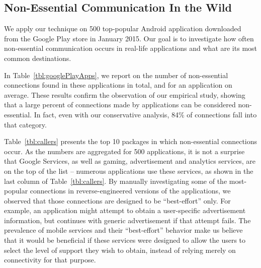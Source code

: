 \subsection{Non-Essential Communication In the Wild}
We apply our technique on 500 top-popular Android application downloaded from the Google Play store in January 2015. 
Our goal is to investigate how often non-essential communication occurs in real-life applications and what are its most common destinations. 

In Table~\ref{tbl:googlePlayApps}, we report on the number of non-essential connections found in these applications in total, and for an application on average. 
These results confirm the observation of our empirical study, showing that a large percent of connections made by applications can be considered non-essential. 
In fact, even with our conservative analysis, 84\% of connections fall into that category. 

Table~\ref{tbl:callers} presents the top 10 packages in which non-essential connections occur.
As the numbers are aggregated for 500 applications, it is not a surprise that Google Services, as well as gaming, advertisement and analytics services, are on the top of the list -- numerous applications use these services, as shown in the last column of Table~\ref{tbl:callers}. 
By manually investigating some of the most-popular connections in reverse-engineered versions of the applications, we observed that
those connections are designed to be ``best-effort'' only. For example, an application might attempt to obtain a user-specific advertisement information, but continues 
with generic advertisement if that attempt fails. 
The prevalence of mobile services and their ``best-effort'' behavior make us believe that it would be beneficial if these services were designed to allow the users to select the level of support they wish to obtain, instead of relying merely on connectivity for that purpose.  

 






